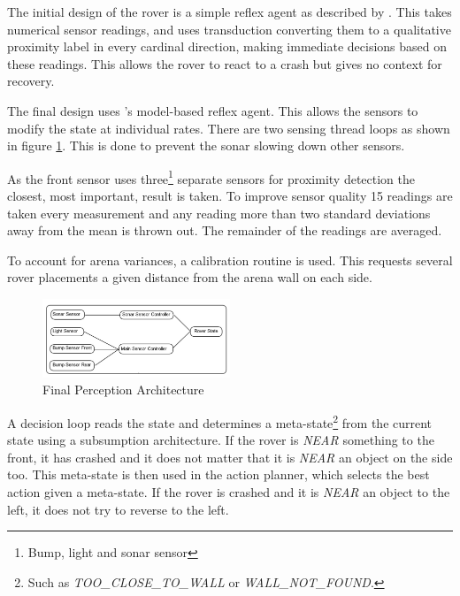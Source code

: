 \documentclass[a4paper,12pt,twocolumn]{report}
\begin{document}

The initial design of the rover is a simple reflex agent as described by \cite{russell1995modern}. This takes numerical sensor readings, and uses transduction converting them to a qualitative proximity label in every cardinal direction, making immediate decisions based on these readings. This allows the rover to react to a crash but gives no context for recovery.

The final design uses \cite{russell1995modern}'s model-based reflex agent. This allows the sensors to modify the state at individual rates. There are two sensing thread loops as shown in figure \ref{fig:perception}. This is done to prevent the sonar slowing down other sensors.

As the front sensor uses three\footnote{Bump, light and sonar sensor} separate sensors for proximity detection the closest, most important, result is taken. To improve sensor quality 15 readings are taken every measurement and any reading more than two standard deviations away from the mean is thrown out. The remainder of the readings are averaged.

To account for arena variances, a calibration routine is used. This requests several rover placements a given distance from the arena wall on each side.

\begin{figure}
 \includegraphics[width=0.5\textwidth]{sensing-diagram}
 \caption{Final Perception Architecture}
 \label{fig:perception}
\end{figure}

A decision loop reads the state and determines a meta-state\footnote{Such as \emph{TOO\_CLOSE\_TO\_WALL} or \emph{WALL\_NOT\_FOUND}.} from the current state using a subsumption architecture. If the rover is \emph{NEAR} something to the front, it has crashed and it does not matter that it is \emph{NEAR} an object on the side too. This meta-state is then used in the action planner, which selects the best action given a meta-state. If the rover is crashed and it is \emph{NEAR} an object to the left, it does not try to reverse to the left.
\end{document}
